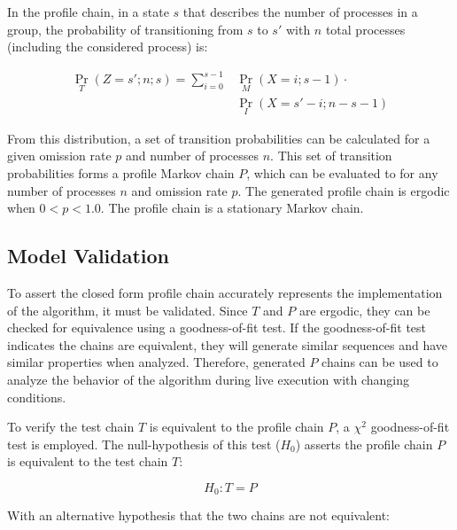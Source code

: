 In the profile chain, in a state $s$ that describes the number of processes in a group, the probability of transitioning from $s$ to $s'$ with $n$ total processes (including the considered process) is:

\begin{align} \Pr_{T}(Z=s'; n; s) = \sum_{i=0}^{s-1} &\Pr_{M}(X=i; s-1) \cdot
\nonumber \\ &\Pr_{I}(X=s'-i; n-s-1) \end{align}

From this distribution, a set of transition probabilities can be calculated for a given omission rate $p$ and number of processes $n$.
This set of transition probabilities forms a profile Markov chain $P$, which can be evaluated to for any number of processes $n$ and omission rate $p$.
The generated profile chain is ergodic when $0<p<1.0$. The profile chain is a stationary Markov chain.

\subsection{Model Validation}


To assert the closed form profile chain accurately represents the implementation of the algorithm, it must be validated.
Since $T$ and $P$ are ergodic, they can be checked for equivalence using a goodness-of-fit test.
If the goodness-of-fit test indicates the chains are equivalent, they will generate similar sequences and have similar properties when analyzed.
Therefore, generated $P$ chains can be used to analyze the behavior of the algorithm during live execution with changing conditions.

To verify the test chain $T$ is equivalent to the profile chain $P$, a $\chi^2$ goodness-of-fit test is employed.
The null-hypothesis of this test ($H_{0}$) asserts the profile chain $P$ is equivalent to the test chain $T$:

\begin{equation} H_{0}: T = P \end{equation}

With an alternative hypothesis that the two chains are not equivalent:

